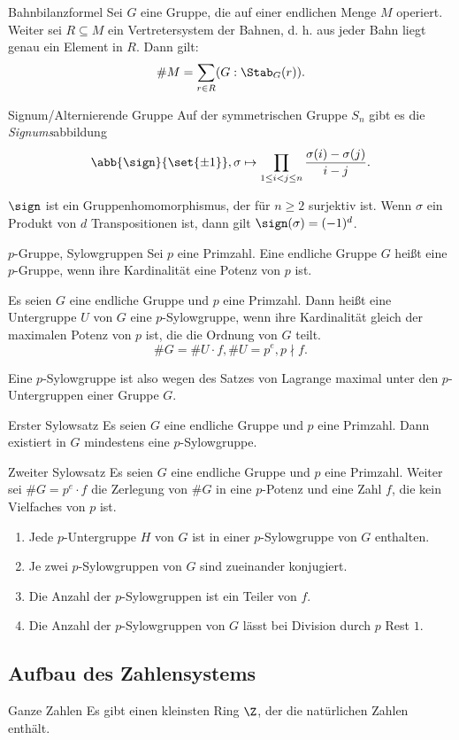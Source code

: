 \begin{karte}{Bahnbilanzformel}
    Sei \(G\) eine Gruppe, die auf einer endlichen Menge \(M\) operiert. 
    Weiter sei \(R\subseteq M\) ein Vertretersystem der Bahnen, d. h. 
    aus jeder Bahn liegt genau ein Element in \(R\). Dann gilt: 
    \[ \#M = \sum_{r\in R} (G:\Stab_G(r)). \]
\end{karte}

\begin{karte}{Signum/Alternierende Gruppe}
    Auf der symmetrischen Gruppe \(S_n\) gibt es die \textit{Signums}abbildung 
    \[ \abb{\sign}{\set{\pm 1}}, \sigma \mapsto \prod_{1\leq i < j \leq n} 
    \frac{\sigma(i) - \sigma(j)}{i - j}. \]

    \(\sign\) ist ein Gruppenhomomorphismus, der für \(n\geq 2\) 
    surjektiv ist. Wenn \(\sigma\) ein Produkt von \(d\) Transpositionen ist, 
    dann gilt \(\sign(\sigma) = (-1)^d\).
\end{karte}

\begin{karte}{\(p\)-Gruppe, Sylowgruppen}
    Sei \(p\) eine Primzahl. Eine endliche Gruppe \(G\) heißt eine 
    \(p\)-Gruppe, wenn ihre Kardinalität eine Potenz von \(p\) ist.

    Es seien \(G\) eine endliche Gruppe und \(p\) eine Primzahl. 
    Dann heißt eine Untergruppe \(U\) von \(G\) eine 
    \(p\)-Sylowgruppe, wenn ihre Kardinalität gleich 
    der maximalen Potenz von \(p\) ist, die die Ordnung von \(G\) teilt. 
    \[ \# G = \# U \cdot f, \# U = p^e, p \nmid f. \]
    
    Eine \(p\)-Sylowgruppe ist also wegen des Satzes von Lagrange maximal 
    unter den \(p\)-Untergruppen einer Gruppe \(G\). 
\end{karte}

\begin{karte}{Erster Sylowsatz}
    Es seien \(G\) eine endliche Gruppe und \(p\) eine Primzahl. 
    Dann existiert in \(G\) mindestens eine \(p\)-Sylowgruppe. 
\end{karte}

\begin{karte}{Zweiter Sylowsatz}
    Es seien \(G\) eine endliche Gruppe und \(p\) eine Primzahl. 
    Weiter sei \(\#G = p^e \cdot f \) die Zerlegung von \(\#G\) 
    in eine \(p\)-Potenz und eine Zahl \(f\), die kein Vielfaches
    von \(p\) ist. 
    \begin{enumerate}
        \item Jede \(p\)-Untergruppe \(H\) von \(G\) ist in einer 
        \(p\)-Sylowgruppe von \(G\) enthalten. 
        \item Je zwei \(p\)-Sylowgruppen von \(G\) sind zueinander konjugiert. 
        \item Die Anzahl der \(p\)-Sylowgruppen ist ein Teiler von \(f\). 
        \item Die Anzahl der \(p\)-Sylowgruppen von \(G\) lässt bei Division durch \(p\) Rest \(1\).
    \end{enumerate}
\end{karte}

\subsection{Aufbau des Zahlensystems}

\begin{karte}{Ganze Zahlen}
    Es gibt einen kleinsten Ring \(\Z\), der die natürlichen Zahlen enthält.
\end{karte}